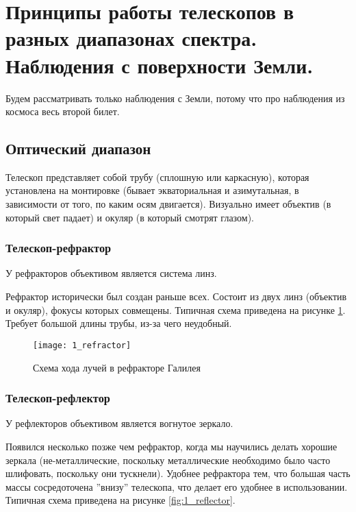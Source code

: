\section{ Принципы работы телескопов в разных диапазонах спектра. Наблюдения с поверхности Земли.}

Будем рассматривать только наблюдения с Земли, потому что про наблюдения из космоса весь второй билет.

\subsection{Оптический диапазон}

Телескоп представляет собой трубу (сплошную или каркасную), которая установлена на монтировке (бывает экваториальная и азимутальная, в зависимости от того, по каким осям двигается). Визуально имеет объектив (в который свет падает) и окуляр (в который смотрят глазом).

\subsubsection{Телескоп-рефрактор}

У рефракторов объективом является система линз.

Рефрактор исторически был создан раньше всех. Состоит из двух линз (объектив и окуляр), фокусы которых совмещены. Типичная схема приведена на рисунке \ref{fig:1_refractor}. Требует большой длины трубы, из-за чего неудобный.

\begin{figure}[H]
	\centering
	\texttt{[image: 1\_refractor]}
	\caption{Схема хода лучей в рефракторе Галилея}
	\label{fig:1_refractor}
\end{figure}

\subsubsection{Телескоп-рефлектор}

У рефлекторов объективом является вогнутое зеркало.

Появился несколько позже чем рефрактор, когда мы научились делать хорошие зеркала (не-металлические, поскольку металлические необходимо было часто шлифовать, поскольку они тускнели). Удобнее рефрактора тем, что большая часть массы сосредоточена ''внизу'' телескопа, что делает его удобнее в использовании. Типичная схема приведена на рисунке \ref{fig:1_reflector}.

